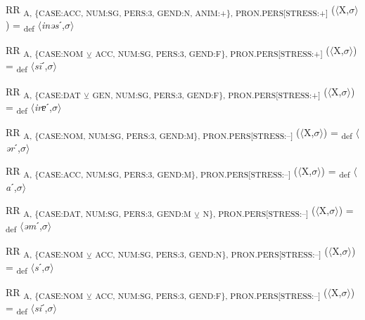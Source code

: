{\begin{exe}
 RR \textsubscript{A, \{CASE:ACC, NUM:SG, PERS:3, GEND:N, ANIM:+\}, PRON.PERS[STRESS:+]} ($\langle$X,$\sigma $$\rangle$) = \textsubscript{def} $\langle$\textit{inəs}ˊ,$\sigma $$\rangle$
\end{exe}

\begin{exe}
 RR \textsubscript{A, \{CASE:NOM} \textsubscript{${\veebar}$}\textsubscript{ ACC, NUM:SG, PERS:3, GEND:F\}, PRON.PERS[STRESS:+]} ($\langle$X,$\sigma $$\rangle$) = \textsubscript{def} $\langle$\textit{s\=i}ˊ,$\sigma $$\rangle$
\end{exe}

\begin{exe}
 RR \textsubscript{A, \{CASE:DAT} \textsubscript{${\veebar}$}\textsubscript{ GEN, NUM:SG, PERS:3, GEND:F\}, PRON.PERS[STRESS:+]} ($\langle$X,$\sigma $$\rangle$) = \textsubscript{def} $\langle$\textit{irɐ}ˊ,$\sigma $$\rangle$
\end{exe}

\begin{exe}
 RR \textsubscript{A, \{CASE:NOM, NUM:SG, PERS:3, GEND:M\}, PRON.PERS[STRESS:–]} ($\langle$X,$\sigma $$\rangle$) = \textsubscript{def} $\langle$\textit{ər}ˊ,$\sigma $$\rangle$
\end{exe}

\begin{exe}
 RR \textsubscript{A, \{CASE:ACC, NUM:SG, PERS:3, GEND:M\}, PRON.PERS[STRESS:–]} ($\langle$X,$\sigma $$\rangle$) = \textsubscript{def} $\langle$\textit{a}ˊ,$\sigma $$\rangle$
\end{exe}

\begin{exe}
 RR \textsubscript{A, \{CASE:DAT, NUM:SG, PERS:3, GEND:M} \textsubscript{${\veebar}$}\textsubscript{ N\}, PRON.PERS[STRESS:–]} ($\langle$X,$\sigma $$\rangle$) = \textsubscript{def} $\langle$\textit{əm}ˊ,$\sigma $$\rangle$
\end{exe}

\begin{exe}
 RR \textsubscript{A, \{CASE:NOM} \textsubscript{${\veebar}$}\textsubscript{ ACC, NUM:SG, PERS:3, GEND:N\}, PRON.PERS[STRESS:–]} ($\langle$X,$\sigma $$\rangle$) = \textsubscript{def} $\langle$\textit{s}ˊ,$\sigma $$\rangle$
\end{exe}

\begin{exe}
 RR \textsubscript{A, \{CASE:NOM} \textsubscript{${\veebar}$}\textsubscript{ ACC, NUM:SG, PERS:3, GEND:F\}, PRON.PERS[STRESS:–]} ($\langle$X,$\sigma $$\rangle$) = \textsubscript{def} $\langle$\textit{si}ˊ,$\sigma $$\rangle$
\end{exe}

}
